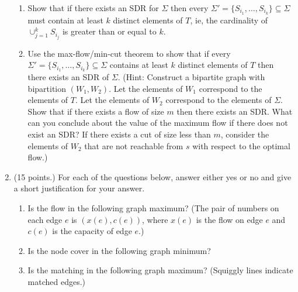 \begin{enumerate}
       \begin{enumerate}
          \item  Show that if there exists an SDR for $\Sigma$ then every
                 ${\Sigma}'=\{S_{i_1},\ldots,S_{i_k}\}\subseteq\Sigma$
                 must contain at least $k$
                 distinct elements of $T$, ie, the cardinality of
                 ${\cup}_{j=1}^k S_{i_j}$ is greater than or equal to $k$.
          \item  Use the max-flow/min-cut theorem to show that if every
                 ${\Sigma}'=\{S_{i_1},\ldots,S_{i_k}\}\subseteq\Sigma$
                 contains at least $k$
                 distinct elements of $T$ then there exists an SDR of
                 $\Sigma$.
                 (Hint:  Construct a bipartite graph with bipartition
                 $(W_1,W_2)$.  Let the elements of $W_1$ correspond to the
                 elements of $T$. Let the elements of $W_2$ correspond to the
                 elements of $\Sigma$.
                 Show that if there exists a flow of size $m$ then there
                 exists an SDR.
                 What can you conclude about the value of the maximum flow
                 if there does not exist an SDR?
                 If there exists a cut of size less than $m$, consider the
                 elements of $W_2$ that are not reachable from $s$ with
                 respect to the optimal flow.)
        \end{enumerate}

\newpage
  \quad
\newpage

   \item  (15 points.)
          For each of the questions below, answer either yes or no and give
          a short justification for your answer.
      \begin{enumerate}
          \item Is the flow in the following graph maximum?
                (The pair of numbers on each edge $e$ is $(x(e),c(e))$,
                where $x(e)$ is the flow on edge $e$ and $c(e)$ is the
                capacity of edge $e$.)
            \vspace{2.3in}
          \item Is the node cover in the following graph minimum?
            \vspace{2.3in}
          \item Is the matching in the following graph maximum?
                (Squiggly lines indicate matched edges.)
      \end{enumerate}

\end{enumerate}




